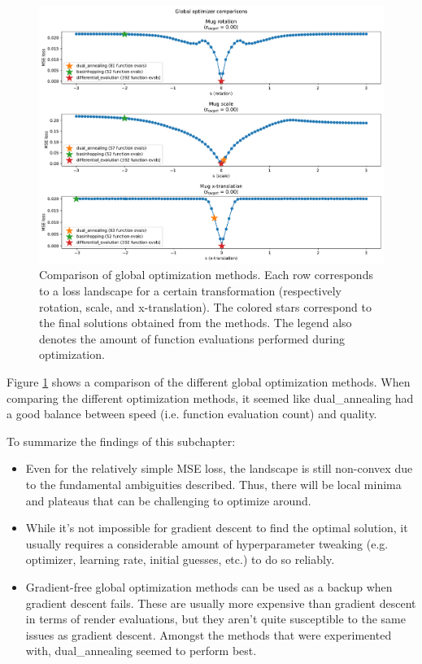 \begin{figure}[H]
    \centering
    \includegraphics[width=1.0\textwidth]{figures/3_1-global-optimizers.pdf}
    \caption{Comparison of global optimization methods. Each row corresponds to a loss landscape for a certain transformation (respectively rotation, scale, and x-translation). The colored stars correspond to the final solutions obtained from the methods. The legend also denotes the amount of function evaluations performed during optimization.}
    \label{fig:3_1-global-optimizers}
\end{figure}
Figure \ref{fig:3_1-global-optimizers} shows a comparison of the different global optimization methods. When comparing the different optimization methods, it seemed like dual\_annealing had a good balance between speed (i.e. function evaluation count) and quality.

To summarize the findings of this subchapter:
\begin{itemize}[noitemsep]
    \item Even for the relatively simple MSE loss, the landscape is still non-convex due to the fundamental ambiguities described. Thus, there will be local minima and plateaus that can be challenging to optimize around.

    \item While it's not impossible for gradient descent to find the optimal solution, it usually requires a considerable amount of hyperparameter tweaking (e.g. optimizer, learning rate, initial guesses, etc.) to do so reliably.
    
    \item Gradient-free global optimization methods can be used as a backup when gradient descent fails. These are usually more expensive than gradient descent in terms of render evaluations, but they aren't quite susceptible to the same issues as gradient descent. Amongst the methods that were experimented with, dual\_annealing seemed to perform best.
\end{itemize}

